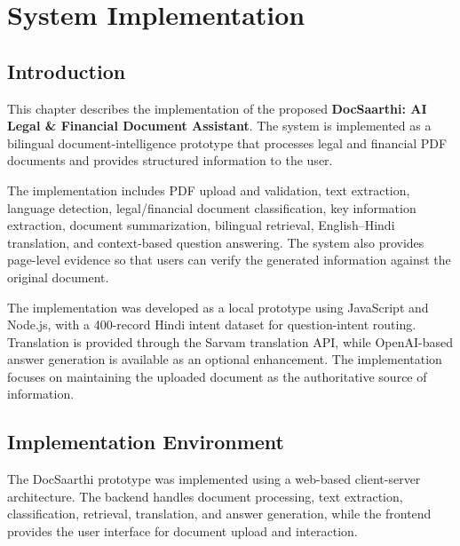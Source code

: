 
\chapter{System Implementation}
\label{chap:system_implementation}

\section{Introduction}

This chapter describes the implementation of the proposed
\textbf{DocSaarthi: AI Legal \& Financial Document Assistant}.
The system is implemented as a bilingual document-intelligence
prototype that processes legal and financial PDF documents and
provides structured information to the user.

The implementation includes PDF upload and validation, text
extraction, language detection, legal/financial document
classification, key information extraction, document summarization,
bilingual retrieval, English--Hindi translation, and context-based
question answering. The system also provides page-level evidence so
that users can verify the generated information against the original
document.

The implementation was developed as a local prototype using
JavaScript and Node.js, with a 400-record Hindi intent dataset for
question-intent routing. Translation is provided through the Sarvam
translation API, while OpenAI-based answer generation is available as
an optional enhancement. The implementation focuses on maintaining the
uploaded document as the authoritative source of information.

\section{Implementation Environment}

The DocSaarthi prototype was implemented using a web-based
client-server architecture. The backend handles document processing,
text extraction, classification, retrieval, translation, and answer
generation, while the frontend provides the user interface for
document upload and interaction.


